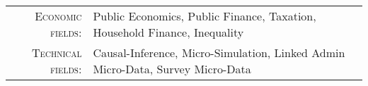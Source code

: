 %
%



\vspace{2.0 mm}

\begin{tabular}{rl}
    \textsc{Economic fields:} & Public Economics, Public Finance, Taxation, Household Finance, Inequality \\
    \textsc{Technical fields:} & Causal-Inference, Micro-Simulation, Linked Admin Micro-Data, Survey Micro-Data \\ 
\end{tabular}

\vspace{4 mm}